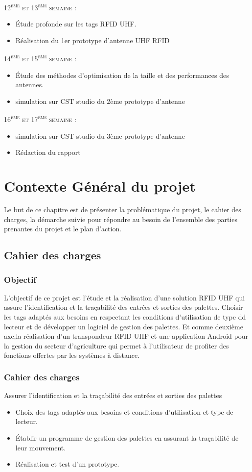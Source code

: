 \documentclass[11pt, a4paper, twoside]{book}
\begin{document}
\textsc{12\textsuperscript{ème} et 13\textsuperscript{ème} semaine :}
\begin{itemize}
\item Étude profonde sur les tags RFID UHF.
\item Réalisation du 1er prototype d'antenne UHF RFID
\end{itemize}
\textsc{14\textsuperscript{ème} et 15\textsuperscript{ème} semaine :}
\begin{itemize}
\item Étude des méthodes d'optimisation de la taille et des performances des antennes.
\item simulation sur CST studio du 2ème prototype d'antenne
\end{itemize}
\textsc{16\textsuperscript{ème} et 17\textsuperscript{ème} semaine :}
\begin{itemize}
\item simulation sur CST studio du 3ème prototype d'antenne
\item Rédaction du rapport
\end{itemize}



\chapter{Contexte Général du projet}
Le but de ce chapitre est de présenter la problématique du projet, le cahier des charges, la démarche suivie pour répondre au besoin de l’ensemble des parties prenantes du projet et le plan d’action.
\section{Cahier des charges}
\subsection{Objectif}
L’objectif de ce projet est l'étude et la réalisation d’une solution RFID UHF qui assure l’identification et la traçabilité des entrées et sorties des palettes. Choisir les tags adaptés aux besoins en respectant les conditions d’utilisation de type dd lecteur et de développer un logiciel de gestion des palettes. 
Et comme deuxième axe,la réalisation d’un transpondeur RFID UHF et une application Android pour la gestion du secteur d'agriculture qui permet à
l’utilisateur de profiter des fonctions offertes par les systèmes à distance. \\
\subsection{Cahier des charges}
Assurer l’identification et la traçabilité des entrées et sorties des palettes
\begin{itemize}
\item Choix des tags adaptés aux besoins et conditions d’utilisation et type de lecteur.
\item Établir un programme de gestion des palettes en assurant la traçabilité de leur mouvement.
\item Réalisation et test d’un prototype.\\
\end{itemize}
\end{document}
